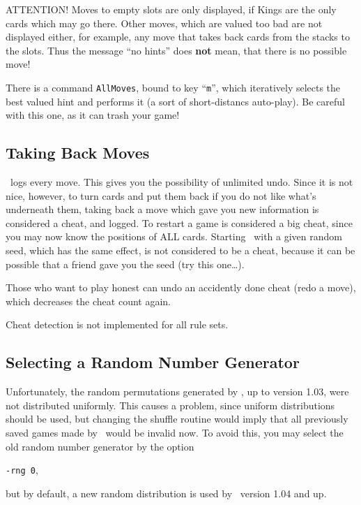ATTENTION! Moves to empty slots are only displayed, if Kings are the only
cards which may go there. Other moves, which are valued too bad are not
displayed either, for example, any move that takes back cards from the stacks
to the slots. Thus the message ``no hints'' does {\bf not} mean, that there
is no possible move!

There is a command {\tt AllMoves}, bound to key ``{\tt m}'',
which iteratively selects the best valued
hint and performs it (a sort of short-distancs auto-play).
Be careful with this one, as it can trash your game!

\subsection{Taking Back Moves}
\xpat\ logs every move. This gives you the possibility of unlimited undo.
Since it is not nice, however, to turn cards and put them back if you do not
like what's underneath them, taking back a move which gave you new information
is considered a cheat, and logged. To restart a game is considered a big cheat,
since you may now know the positions of ALL cards. Starting \xpat\ with a given
random seed, which has the same effect, is not considered to be a cheat,
because it can be possible that a friend gave you the seed (try this
one\ldots).

Those who want to play honest can undo an accidently done cheat (redo a move),
which decreases the cheat count again.

Cheat detection is not implemented for all rule sets.

\subsection{Selecting a Random Number Generator}
Unfortunately, the random permutations generated by \xpat, up to version 1.03,
were not distributed uniformly. This causes a problem, since uniform
distributions should be used, but changing the shuffle routine would imply
that all previously saved games made by \xpat\ would be invalid now.
To avoid this, you may select the old random number generator by the option
\begin{center}
  {\tt -rng 0},
\end{center}
but by default, a new random distribution is used by \xpat\ version 1.04 and
up.




